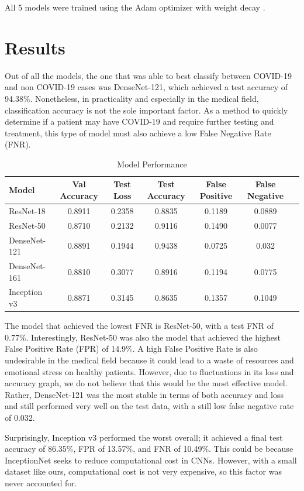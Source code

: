 \documentclass{article}
\begin{document}
All 5 models were trained using the Adam optimizer with weight decay \cite{kingma2017adam}.

\section{Results}
Out of all the models, the one that was able to best classify between COVID-19 and non COVID-19 cases was DenseNet-121, which achieved a test accuracy of 94.38\%. Nonetheless, in practicality and especially in the medical field, classification accuracy is not the sole important factor. As a method to quickly determine if a patient may have COVID-19 and require further testing and treatment, this type of model must also achieve a low False Negative Rate (FNR).
\begin{table}[h]
\centering
\caption{Model Performance}
\begin{tabular}{lcccccc}
\toprule
    Model & Val Accuracy & Test Loss & Test Accuracy & False Positive & False Negative \\
    \midrule
    ResNet-18 & 0.8911 & 0.2358 & 0.8835 & 0.1189 & 0.0889 \\
    \addlinespace
    ResNet-50 & 0.8710 & 0.2132 & 0.9116 & 0.1490 & 0.0077 \\
    \addlinespace
    DenseNet-121 & 0.8891 & 0.1944 & 0.9438 & 0.0725 & 0.032 \\
    \addlinespace
    DenseNet-161 & 0.8810 & 0.3077 & 0.8916 & 0.1194 & 0.0775 \\
    \addlinespace
    Inception v3 & 0.8871 & 0.3145 & 0.8635 & 0.1357 & 0.1049 \\
\bottomrule
\end{tabular}
\end{table}

The model that achieved the lowest FNR is ResNet-50, with a test FNR of 0.77\%. Interestingly, ResNet-50 was also the model that achieved the highest False Positive Rate (FPR) of 14.9\%. A high False Positive Rate is also undesirable in the medical field because it could lead to a waste of resources and emotional stress on healthy patients. However, due to fluctuations in its loss and accuracy graph, we do not believe that this would be the most effective model. Rather, DenseNet-121 was the most stable in terms of both accuracy and loss and still performed very well on the test data, with a still low false negative rate of 0.032.

Surprisingly, Inception v3 performed the worst overall; it achieved a final test accuracy of 86.35\%, FPR of 13.57\%, and FNR of 10.49\%. This could be because InceptionNet seeks to reduce computational cost in CNNs. However, with a small dataset like ours, computational cost is not very expensive, so this factor was never accounted for.
\end{document}
